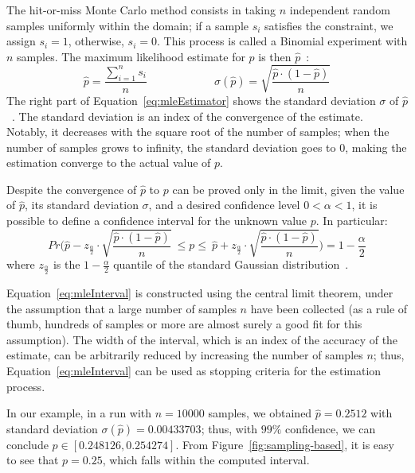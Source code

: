 The hit-or-miss Monte Carlo method consists in taking $n$ independent random samples uniformly within the domain; if a sample $s_i$ satisfies the constraint, we assign $s_i=1$, otherwise, $s_i=0$. This process is called a Binomial experiment with $n$ samples. The maximum likelihood estimate for $p$ is then $\hat{p}$~\cite{pestman1998mathematical}:
%
\begin{equation}\label{eq:mleEstimator}
	\hat{p} = \frac{\sum_{i=1}^n s_i}{n} \qquad\qquad\qquad \sigma(\hat{p}) = \sqrt{\frac{\hat{p} \cdot (1-\hat{p})}{n}}
\end{equation}
%
The right part of Equation~\eqref{eq:mleEstimator} shows the standard deviation $\sigma$ of $\hat{p}$~\cite{pestman1998mathematical}. The standard deviation is an index of the convergence of the estimate. Notably, it decreases with the square root of the number of samples; when the number of samples grows to infinity, the standard deviation goes to $0$, making the estimation converge to the actual value of $p$.

Despite the convergence of $\hat{p}$ to $p$ can be proved only in the limit, given the value of $\hat{p}$, its standard deviation $\sigma$, and a desired confidence level $0<\alpha<1$, it is possible to define a confidence interval for the unknown value $p$. In particular:
%
\begin{equation}\label{eq:mleInterval}
	Pr\Big( \hat{p} - z_{\frac{\alpha}{2}} \cdot \sqrt{\frac{\hat{p} \cdot (1-\hat{p})}{n}} \ \leq p \leq \ \hat{p} + z_{\frac{\alpha}{2}} \cdot \sqrt{\frac{\hat{p} \cdot (1-\hat{p})}{n}} \Big) = 1-\frac{\alpha}{2}
\end{equation}
%
\noindent where $z_{\frac{\alpha}{2}}$ is the $1-\frac{\alpha}{2}$ quantile of the standard Gaussian distribution~\cite{pestman1998mathematical}.

Equation~\eqref{eq:mleInterval} is constructed using the central limit theorem, under the assumption that a large number of samples $n$ have been collected (as a rule of thumb, hundreds of samples or more are almost surely a good fit for this assumption). The width of the interval, which is an index of the accuracy of the estimate, can be arbitrarily reduced by increasing the number of samples $n$; thus, Equation~\eqref{eq:mleInterval} can be used as stopping criteria for the estimation process.

In our example, in a run with $n=10000$ samples, we obtained $\hat{p}= 0.2512$ with standard deviation $\sigma(\hat{p})=0.00433703$; thus, with $99\%$ confidence, we can conclude $p \in [0.248126, 0.254274]$. From Figure~\ref{fig:sampling-based}, it is easy to see that $p=0.25$, which falls within the computed interval.

